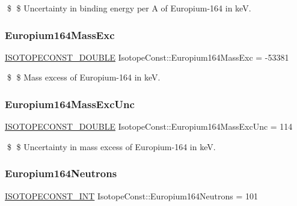 \$ \$ Uncertainty in binding energy per A of Europium-\/164 in keV. \mbox{\label{group___isotope_const-_europium-_eu164_ga9106b4d7902d85254f9223a8be534033}} 
\subsubsection{\texorpdfstring{Europium164\+Mass\+Exc}{Europium164MassExc}}
{\footnotesize\ttfamily \mbox{\hyperlink{group___isotope_const-_macros_ga8f45a7272ce02c0b4c65c44636ed719a}{I\+S\+O\+T\+O\+P\+E\+C\+O\+N\+S\+T\+\_\+\+D\+O\+U\+B\+LE}} Isotope\+Const\+::\+Europium164\+Mass\+Exc = -\/53381}

\$ \$ Mass excess of Europium-\/164 in keV. \mbox{\label{group___isotope_const-_europium-_eu164_gaa2868f6a9b39493c6dd4b2bbb1b0d5de}} 
\subsubsection{\texorpdfstring{Europium164\+Mass\+Exc\+Unc}{Europium164MassExcUnc}}
{\footnotesize\ttfamily \mbox{\hyperlink{group___isotope_const-_macros_ga8f45a7272ce02c0b4c65c44636ed719a}{I\+S\+O\+T\+O\+P\+E\+C\+O\+N\+S\+T\+\_\+\+D\+O\+U\+B\+LE}} Isotope\+Const\+::\+Europium164\+Mass\+Exc\+Unc = 114}

\$ \$ Uncertainty in mass excess of Europium-\/164 in keV. \mbox{\label{group___isotope_const-_europium-_eu164_ga820cc75322be778ae548700b4f415e6f}} 
\subsubsection{\texorpdfstring{Europium164\+Neutrons}{Europium164Neutrons}}
{\footnotesize\ttfamily \mbox{\hyperlink{group___isotope_const-_macros_ga5f18360b3e99483a35c32d789e62621c}{I\+S\+O\+T\+O\+P\+E\+C\+O\+N\+S\+T\+\_\+\+I\+NT}} Isotope\+Const\+::\+Europium164\+Neutrons = 101}

